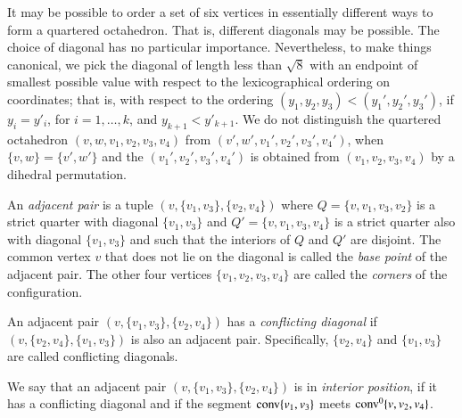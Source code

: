 \begin{remark}\label{def:oct-order}
It may be possible to order a set of six vertices in essentially
different ways to form a quartered octahedron.  That is, different
diagonals may be possible.    The choice of diagonal has no
particular importance.
%
Nevertheless, to make things canonical, we
pick the diagonal of length less than $\sqrt8$ with an endpoint of
smallest possible value with respect to the lexicographical
ordering on coordinates; that is, with respect to the ordering
$(y_1,y_2,y_3) < (y_1',y_2',y_3')$, if $y_i=y'_i$, for
$i=1,\ldots,k$, and $y_{k+1}<y'_{k+1}$.  
%
We do not distinguish the quartered octahedron
$(v,w,v_1,v_2,v_3,v_4)$ from $(v',w',v_1',v_2',v_3',v_4')$, when
$\{v,w\} = \{v',w'\}$ and the $(v_1',v_2',v_3',v_4')$ is obtained
from $(v_1,v_2,v_3,v_4)$ by a dihedral permutation.
\end{remark}




\begin{definition}\label{def:adj-pair}\label{def:corner}
An {\it adjacent pair} is a tuple
$(v,\{v_1,v_3\},\{v_2,v_4\})$ where $Q=\{v,v_1,v_3,v_2\}$ is a
strict quarter with diagonal $\{v_1,v_3\}$ and
$Q'=\{v,v_1,v_3,v_4\}$ is a strict quarter also with diagonal
$\{v_1,v_3\}$ and such that the interiors of $Q$ and $Q'$ are
disjoint.  The common vertex $v$ that does not lie on the diagonal
is called the {\it base point\/} of the adjacent pair.   The other
four vertices $\{v_1,v_2,v_3,v_4\}$ are called the {\it corners\/}
of the configuration.
%
\end{definition}


\begin{definition}\label{def:conflicting-diag} An adjacent pair
$(v,\{v_1,v_3\},\{v_2,v_4\})$ has a {\it conflicting
diagonal} if
$(v,\{v_2,v_4\},\{v_1,v_3\})$ is also an adjacent pair.
Specifically, $\{v_2,v_4\}$ and $\{v_1,v_3\}$ are called
conflicting diagonals.
\end{definition}

\begin{definition}\label{def:interior-position}  We say
that an adjacent pair $(v,\{v_1,v_3\},\{v_2,v_4\})$ is in {\it
interior position}, if it has a conflicting diagonal and if the
segment ${\operatorname{conv}}\{v_1,v_3\}$ meets
${\operatorname{conv}}^0\{v,v_2,v_4\}$. 
\end{definition}

